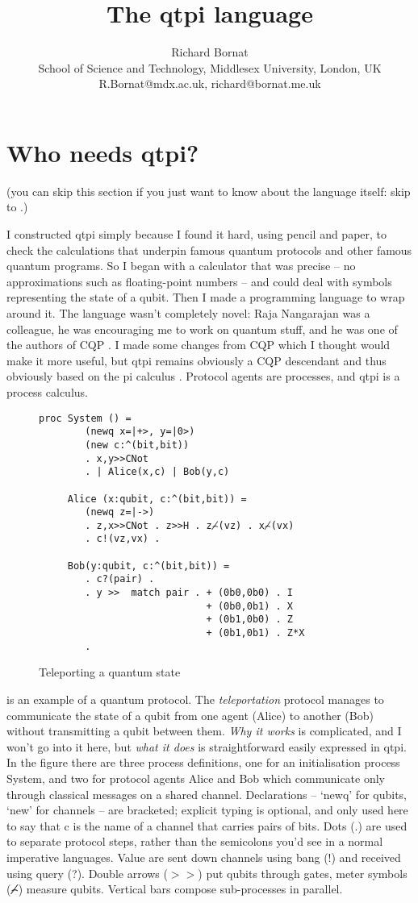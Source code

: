 \documentclass[11pt,a4paper]{article}
\title{The qtpi language}
\author{Richard Bornat \\ School of Science and Technology, Middlesex University, London, UK \\ R.Bornat@mdx.ac.uk, richard@bornat.me.uk}
\begin{document}
\newpage
\tableofcontents
\newpage
\section{Who needs qtpi?}

(you can skip this section if you just want to know about the language itself: skip to .)

I constructed qtpi simply because I found it hard, using pencil and paper, to check the calculations that underpin famous quantum protocols and other famous quantum programs. So I began with a calculator that was precise -- no approximations such as floating-point numbers -- and could deal with symbols representing the state of a qubit. Then I made a programming language to wrap around it. The language wasn't completely novel: Raja Nangarajan was a colleague, he was encouraging me to work on quantum stuff, and he was one of the authors of CQP \citep{GaySJ:comqp}. I made some changes from CQP which I thought would make it more useful, but qtpi remains obviously a CQP descendant and thus obviously based on the pi calculus \citep{DBLP:journals/iandc/MilnerPW92a}. Protocol agents are processes, and qtpi is a process calculus. 

\begin{figure}
\centering
\begin{verbatim}
proc System () = 
        (newq x=|+>, y=|0>)  
        (new c:^(bit,bit))
        . x,y>>CNot 
        . | Alice(x,c) | Bob(y,c)

     Alice (x:qubit, c:^(bit,bit)) = 
        (newq z=|->) 
        . z,x>>CNot . z>>H . z⌢̸(vz) . x⌢̸(vx)
        . c!(vz,vx) .  

     Bob(y:qubit, c:^(bit,bit)) = 
        . c?(pair) . 
        . y >>  match pair . + (0b0,0b0) . I
                             + (0b0,0b1) . X
                             + (0b1,0b0) . Z
                             + (0b1,0b1) . Z*X 
        . 
\end{verbatim}
\caption{Teleporting a quantum state}
\end{figure}

 is an example of a quantum protocol. The \emph{teleportation} protocol \citep{bbcjp:93}\citep{teleportwiki} manages to communicate the state of a qubit from one agent (Alice) to another (Bob) without transmitting a qubit between them. \emph{Why it works} is complicated, and I won't go into it here, but \emph{what it does} is straightforward easily expressed in qtpi. In the figure there are three process definitions, one for an initialisation process System, and two for protocol agents Alice and Bob which communicate only through classical messages on a shared channel. Declarations -- `newq' for qubits, `new' for channels -- are bracketed; explicit typing is optional, and only used here to say that c is the name of a channel that carries pairs of bits. Dots (.) are used to separate protocol steps, rather than the semicolons you'd see in a normal imperative languages. Value are sent down channels using bang (!) and received using query (?). Double arrows ($>\!>$) put qubits through gates, meter symbols (⌢̸) measure qubits. Vertical bars compose sub-processes in parallel. 
\end{document}
